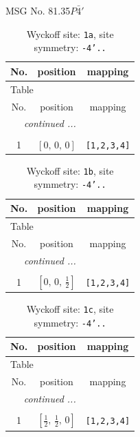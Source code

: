 \documentclass[fleqn,8pt]{jsarticle}
\begin{document}
\setcounter{MaxMatrixCols}{32}

\renewcommand{\tablename}{Table~}
\renewcommand{\figurename}{Figure~}
\begin{center}
\LARGE
MSG No. 81.35\quad$P\bar{4}'$
\end{center}
\renewcommand{\arraystretch}{1.2}
\begin{longtable}{ccc}
\caption{Wyckoff site: {\tt 1a}, site symmetry: {\tt -4'..}}
 \\
 \hline \hline
No. & position & mapping \\ \hline \endfirsthead

\multicolumn{2}{l}{\tablename\ \thetable{}} \\
 \hline \hline
No. & position & mapping \\ \hline \endhead

 \hline \hline
\multicolumn{2}{r}{\footnotesize\it continued ...} \\ \endfoot

 \hline \hline
\multicolumn{2}{r}{} \\ \endlastfoot

1 & $\left[ 0,\, 0,\, 0 \right]$ & {\tt [1,2,3,4]} \\
\end{longtable}
\renewcommand{\arraystretch}{1.2}
\begin{longtable}{ccc}
\caption{Wyckoff site: {\tt 1b}, site symmetry: {\tt -4'..}}
 \\
 \hline \hline
No. & position & mapping \\ \hline \endfirsthead

\multicolumn{2}{l}{\tablename\ \thetable{}} \\
 \hline \hline
No. & position & mapping \\ \hline \endhead

 \hline \hline
\multicolumn{2}{r}{\footnotesize\it continued ...} \\ \endfoot

 \hline \hline
\multicolumn{2}{r}{} \\ \endlastfoot

1 & $\left[ 0,\, 0,\, \frac{1}{2} \right]$ & {\tt [1,2,3,4]} \\
\end{longtable}
\renewcommand{\arraystretch}{1.2}
\begin{longtable}{ccc}
\caption{Wyckoff site: {\tt 1c}, site symmetry: {\tt -4'..}}
 \\
 \hline \hline
No. & position & mapping \\ \hline \endfirsthead

\multicolumn{2}{l}{\tablename\ \thetable{}} \\
 \hline \hline
No. & position & mapping \\ \hline \endhead

 \hline \hline
\multicolumn{2}{r}{\footnotesize\it continued ...} \\ \endfoot

 \hline \hline
\multicolumn{2}{r}{} \\ \endlastfoot

1 & $\left[ \frac{1}{2},\, \frac{1}{2},\, 0 \right]$ & {\tt [1,2,3,4]} \\
\end{longtable}
\end{document}

